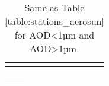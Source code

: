 \documentclass[journal abbreviation, manuscript]{copernicus}
\begin{document}
\begin{table}
\begin{tabularx}{\textwidth}{lX}
                                                                                                                                                                                                                                                                                                                                                                                                                                                      \\
  \bottomhline
 \end{tabularx}
 \caption{Same as Table \ref{table:stations_aerosun} for AOD<1µm and AOD>1µm.}
 \label{table:stations_aerosda}
\end{table}

\clearpage

\begin{table}
 \tiny
 \begin{tabularx}{\textwidth}{lX}
     \tophline

\end{tabularx}
\end{table}
\end{document}
